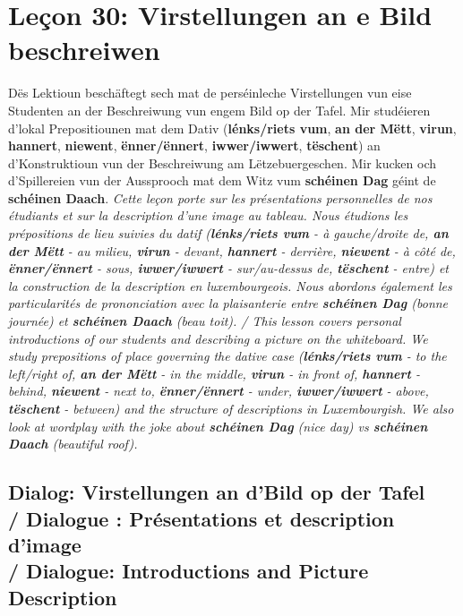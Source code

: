\chapter{Leçon 30: Virstellungen an e Bild beschreiwen}

Dës Lektioun beschäftegt sech mat de perséinleche Virstellungen vun eise Studenten an der Beschreiwung vun engem Bild op der Tafel. Mir studéieren d'lokal Prepositiounen mat dem Dativ (\textbf{lénks/riets vum}, \textbf{an der Mëtt}, \textbf{virun}, \textbf{hannert}, \textbf{niewent}, \textbf{ënner/ënnert}, \textbf{iwwer/iwwert}, \textbf{tëschent}) an d'Konstruktioun vun der Beschreiwung am Lëtzebuergeschen. Mir kucken och d'Spillereien vun der Aussprooch mat dem Witz vum \textbf{schéinen Dag} géint de \textbf{schéinen Daach}. \textit{Cette leçon porte sur les présentations personnelles de nos étudiants et sur la description d'une image au tableau. Nous étudions les prépositions de lieu suivies du datif (\textbf{lénks/riets vum} - à gauche/droite de, \textbf{an der Mëtt} - au milieu, \textbf{virun} - devant, \textbf{hannert} - derrière, \textbf{niewent} - à côté de, \textbf{ënner/ënnert} - sous, \textbf{iwwer/iwwert} - sur/au-dessus de, \textbf{tëschent} - entre) et la construction de la description en luxembourgeois. Nous abordons également les particularités de prononciation avec la plaisanterie entre \textbf{schéinen Dag} (bonne journée) et \textbf{schéinen Daach} (beau toit). / This lesson covers personal introductions of our students and describing a picture on the whiteboard. We study prepositions of place governing the dative case (\textbf{lénks/riets vum} - to the left/right of, \textbf{an der Mëtt} - in the middle, \textbf{virun} - in front of, \textbf{hannert} - behind, \textbf{niewent} - next to, \textbf{ënner/ënnert} - under, \textbf{iwwer/iwwert} - above, \textbf{tëschent} - between) and the structure of descriptions in Luxembourgish. We also look at wordplay with the joke about \textbf{schéinen Dag} (nice day) vs \textbf{schéinen Daach} (beautiful roof).}

\vspace{1em}

\section[Dialog: Virstellungen an d'Bild op der Tafel / Dialogue / Dialogue]{Dialog: Virstellungen an d'Bild op der Tafel \\/ Dialogue : Présentations et description d'image \\/ Dialogue: Introductions and Picture Description}

